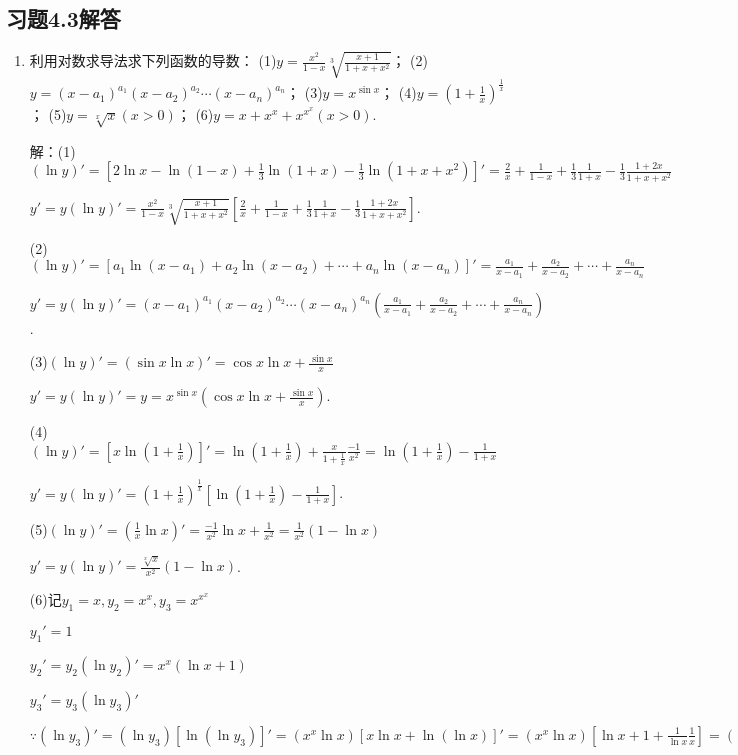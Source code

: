 \documentclass[12pt,UTF8]{ctexart}
\begin{document}
\subsection{习题4.3解答}
\begin{enumerate}
\item 利用对数求导法求下列函数的导数：
\newline
(1)$y=\frac{x^2}{1-x}\sqrt[3]{\frac{x+1}{1+x+x^2}}$；
\newline
(2)$y=(x-a_1)^{a_1}(x-a_2)^{a_2}\cdots(x-a_n)^{a_n}$；
\newline
(3)$y=x^{\sin x}$；
\newline
(4)$y=(1+\frac1x)^{\frac1x}$；
\newline
(5)$y=\sqrt[x]x(x>0)$；
\newline
(6)$y=x+x^x+x^{x^x}(x>0)$.

解：(1)$(\ln y)'=[2\ln x-\ln(1-x)+\frac13\ln(1+x)-\frac13\ln(1+x+x^2)]'=\frac2x+\frac1{1-x}+\frac13\frac1{1+x}-\frac13\frac{1+2x}{1+x+x^2}$

$y'=y(\ln y)'=\frac{x^2}{1-x}\sqrt[3]{\frac{x+1}{1+x+x^2}}[\frac2x+\frac1{1-x}+\frac13\frac1{1+x}-\frac13\frac{1+2x}{1+x+x^2}]$.

(2)$(\ln y)'=[a_1\ln(x-a_1)+a_2\ln(x-a_2)+\cdots+a_n\ln(x-a_n)]'=\frac{a_1}{x-a_1}+\frac{a_2}{x-a_2}+\cdots+\frac{a_n}{x-a_n}$

$y'=y(\ln y)'=(x-a_1)^{a_1}(x-a_2)^{a_2}\cdots(x-a_n)^{a_n}(\frac{a_1}{x-a_1}+\frac{a_2}{x-a_2}+\cdots+\frac{a_n}{x-a_n})$.

(3)$(\ln y)'=(\sin x\ln x)'=\cos x\ln x+\frac{\sin x}x$

$y'=y(\ln y)'=y=x^{\sin x}(\cos x\ln x+\frac{\sin x}x)$.

(4)$(\ln y)'=[x\ln(1+\frac1x)]'=\ln(1+\frac1x)+\frac{x}{1+\frac1x}\frac{-1}{x^2}=\ln(1+\frac1x)-\frac1{1+x}$

$y'=y(\ln y)'=(1+\frac1x)^{\frac1x}[\ln(1+\frac1x)-\frac1{1+x}]$.

(5)$(\ln y)'=(\frac1x\ln x)'=\frac{-1}{x^2}\ln x+\frac1{x^2}=\frac1{x^2}(1-\ln x)$

$y'=y(\ln y)'=\frac{\sqrt[x]x}{x^2}(1-\ln x)$.

(6)记$y_1=x,y_2=x^x,y_3=x^{x^x}$

$y_1'=1$

$y_2'=y_2(\ln y_2)'=x^x(\ln x+1)$

$y_3'=y_3(\ln y_3)'$

$\because (\ln y_3)'=(\ln y_3)[\ln(\ln y_3)]'=(x^x\ln x)[x\ln x+\ln(\ln x)]'=(x^x\ln x)[\ln x+1+\frac1{\ln x}\frac1x]=(\ln x+1)(x^x\ln x)+x^{x-1}$


\end{enumerate}
\end{document}

